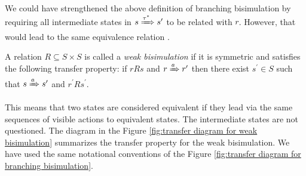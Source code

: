We could have strengthened the above definition of branching bisimulation by requiring all intermediate states in $s\xRightarrow{\tau^*}s^\prime$ to be related with $r$. However, that would lead to the same equivalence relation \cite{DeNicola95Bisimulations}. 

\begin{definition}
  A relation $R\subseteq S\times S$ is called a {\em weak bisimulation} if it is symmetric and satisfies the following transfer property: if $rRs$ and $r\xRightarrow{a} r^\prime$ then there exist $s^\prime\in S$ such that $s \xRightarrow{a} s^\prime$ and $r^\prime Rs^{\prime}$.
\end{definition}

This means that two states are considered equivalent if they lead via the same sequences of visible actions to equivalent states. The intermediate states are not questioned. The diagram in the Figure \ref{fig:transfer diagram for weak bisimulation} summarizes the transfer property for the weak bisimulation. We have used the same notational conventions of the Figure \ref{fig:transfer diagram for branching bisimulation}.

\begin{figure}
  \centering
  \begin{minipage}{.4\textwidth}
    \centering
    \label{fig:example run of a labeled transition system}
  \end{minipage}
  \hspace{.08\textwidth}
  \begin{minipage}{.5\textwidth}
    \centering
    \label{fig:example run of a labeled transition system with hidden branching before the first action}
  \end{minipage}
\end{figure}

